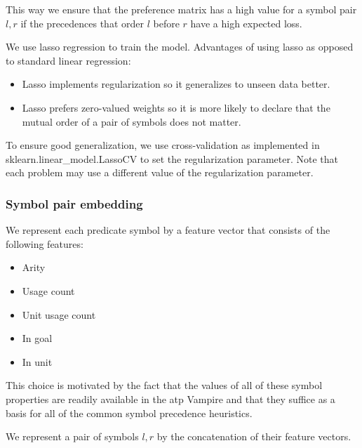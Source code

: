 This way we ensure that the preference matrix has a high value for a symbol pair \(l, r\)
if the precedences that order \(l\) before \(r\) have a high expected loss.

We use lasso regression \cite{?} to train the model.
Advantages of using lasso as opposed to standard linear regression\cite{?}:

\begin{itemize}
	\item Lasso implements regularization so it generalizes to unseen data better.
	\item Lasso prefers zero-valued weights so it is more likely to declare that the mutual order of a pair of symbols does not matter.
\end{itemize}

To ensure good generalization,
we use cross-validation as implemented in sklearn.linear\_model.LassoCV \cite{?}
to set the regularization parameter.
Note that each problem may use a different value of the regularization parameter.

\subsubsection{Symbol pair embedding}

We represent each predicate symbol by a feature vector that consists of the following features:

\begin{itemize}
	\item Arity
	\item Usage count
	\item Unit usage count
	\item In goal
	\item In unit
\end{itemize}

This choice is motivated by the fact that the values of all of these symbol properties
are readily available in the \gls{atp} Vampire
and that they suffice as a basis for all of the common symbol precedence heuristics.

We represent a pair of symbols \(l, r\) by the concatenation of their feature vectors.

